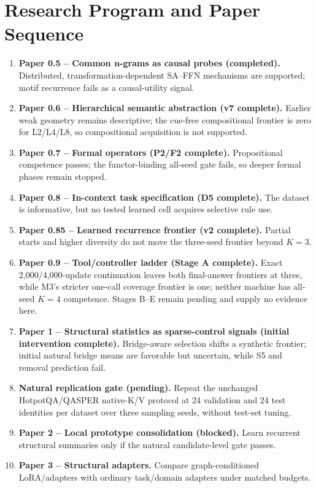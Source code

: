\documentclass[11pt]{article}
\begin{document}
\section{Research Program and Paper Sequence}
\begin{enumerate}[leftmargin=*]
\item \textbf{Paper 0.5 -- Common n-grams as causal probes (completed).} Distributed, transformation-dependent SA--FFN mechanisms are supported; motif recurrence fails as a causal-utility signal.
\item \textbf{Paper 0.6 -- Hierarchical semantic abstraction (v7 complete).} Earlier weak geometry remains descriptive; the cue-free compositional frontier is zero for L2/L4/L8, so compositional acquisition is not supported.
\item \textbf{Paper 0.7 -- Formal operators (P2/F2 complete).} Propositional competence passes; the functor-binding all-seed gate fails, so deeper formal phases remain stopped.
\item \textbf{Paper 0.8 -- In-context task specification (D5 complete).} The dataset is informative, but no tested learned cell acquires selective rule use.
\item \textbf{Paper 0.85 -- Learned recurrence frontier (v2 complete).} Partial starts and higher diversity do not move the three-seed frontier beyond $K=3$.
\item \textbf{Paper 0.9 -- Tool/controller ladder (Stage A complete).} Exact 2,000/4,000-update continuation leaves both final-answer frontiers at three, while M3's stricter one-call coverage frontier is one; neither machine has all-seed $K=4$ competence. Stages B--E remain pending and supply no evidence here.
\item \textbf{Paper 1 -- Structural statistics as sparse-control signals (initial intervention complete).} Bridge-aware selection shifts a synthetic frontier; initial natural bridge means are favorable but uncertain, while S5 and removal prediction fail.
\item \textbf{Natural replication gate (pending).} Repeat the unchanged HotpotQA/QASPER native-K/V protocol at 24 validation and 24 test identities per dataset over three sampling seeds, without test-set tuning.
\item \textbf{Paper 2 -- Local prototype consolidation (blocked).} Learn recurrent structural summaries only if the natural candidate-level gate passes.
\item \textbf{Paper 3 -- Structural adapters.} Compare graph-conditioned LoRA/adapters with ordinary task/domain adapters under matched budgets.

\end{enumerate}
\end{document}
